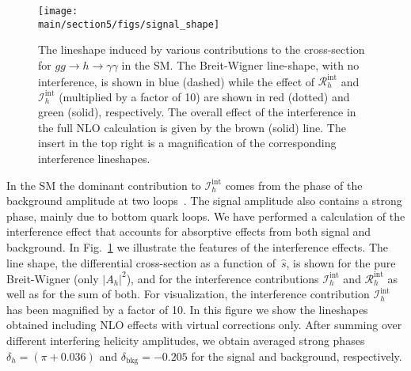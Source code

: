 \begin{figure}[htbp]
\begin{center}
\texttt{[image: \\main/section5/figs/signal\_shape]}
\caption{
The lineshape induced by various contributions to the cross-section for $gg \to h \to \gamma\gamma$ in the SM.
The Breit-Wigner line-shape, with no interference, is shown in blue (dashed) while the effect of $\mathcal{R}_h^\mathrm{int}$ and
$\mathcal{I}_h^\mathrm{int}$ (multiplied by a factor of 10) are shown in red (dotted) and green (solid), respectively.  The overall
effect of the interference in the full NLO calculation is given by the brown (solid) line. The insert in the top right is a magnification of the corresponding interference lineshapes.
}
\label{fig:sig_shape}
\end{center}
\vspace*{-0.6cm}
\end{figure}

In the SM the dominant contribution to $\mathcal{I}_h^\mathrm{int}$ comes from the phase of the background amplitude at two loops~\cite{Dicus:1987fk, Dixon:2003yb}. The signal amplitude also contains a
strong phase, mainly due to bottom quark loops. 
We have performed a calculation of the interference effect that accounts for absorptive effects from both signal and background.
In Fig.~\ref{fig:sig_shape} we illustrate the features of the interference effects.
The line shape, the differential cross-section as a function of~$\hat s$, is shown
for the pure Breit-Wigner (only $|A_h|^2$), and for the interference contributions $\mathcal{I}_h^\mathrm{int}$ and $\mathcal{R}_h^\mathrm{int}$ as well as for the sum of both. 
For visualization, the interference contribution $\mathcal{I}_h^\mathrm{int}$ has been magnified by a factor of 10. 
In this figure we show the lineshapes obtained including NLO effects with virtual corrections only. After summing over different interfering helicity amplitudes, we obtain averaged strong phases $\delta_h= (\pi+0.036)$ and $\delta_\mathrm{bkg}=-0.205$ for the signal and background, respectively.

